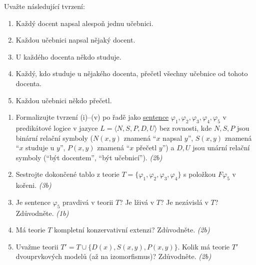 \documentclass[a4paper,12pt]{article}
\begin{document}
\medskip\begin{ukol}[3 body]
    Uvažte následující tvrzení:
    \begin{enumerate}[label=(\roman*)]\it
        \item Každý docent napsal alespoň jednu učebnici.
        \item Každou učebnici napsal nějaký docent.
        \item U každého docenta někdo studuje.
        \item Každý, kdo studuje u nějakého docenta, přečetl všechny učebnice od tohoto docenta.
        \item Každou učebnici někdo přečetl.
    \end{enumerate}    
    \begin{enumerate}
    \item Formalizujte tvrzení (i)--(v) po řadě jako \underline{sentence} $\varphi_1,\varphi_2,\varphi_3,\varphi_4,\varphi_5$ v predikátové logice v jazyce $L=\langle N, S, P, D, U\rangle$ bez rovnosti, kde $N,S,P$ jsou binární relační symboly ($N(x,y)$ znamená ``$x$ napsal $y$'', $S(x,y)$ znamená ``$x$ studuje u $y$'', $P(x,y)$ znamená ``$x$ přečetl $y$'') a $D,U$ jsou unární relační symboly (``být docentem'', ``být učebnicí''). {\it (2b)}
    \item Sestrojte dokončené tablo z teorie $T=\{\varphi_1,\varphi_2,\varphi_3,\varphi_4\}$ s položkou $F\varphi_5$ v kořeni. {\it (3b)}
    \item Je sentence $\varphi_5$ pravdivá v teorii $T$? Je lživá v $T$? Je nezávislá v $T$? Zdůvodněte. {\it (1b)}
    \item Má teorie $T$ kompletní konzervativní extenzi? Zdůvodněte. {\it (2b)}
    \item Uvažme teorii $T'=T\cup \{D(x),S(x,y),P(x,y)\}$. Kolik má teorie $T'$ dvouprvkových modelů (až na izomorfismus)? Zdůvodněte. {\it (2b)}
    \end{enumerate}
\end{ukol}
\end{document}
